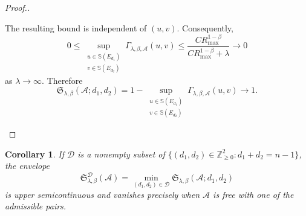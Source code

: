 \documentclass[pdflatex,sn-mathphys-num]{sn-jnl}%
\newtheorem{corollary}{Corollary}
\theoremstyle{remark}
\newtheorem{remark}{Remark}
\theoremstyle{definition}
\begin{document}
\begin{proof}[Proof.]
\begin{itemize}
The resulting bound is independent of $(u,v)$. Consequently,
\[
0
\leq
\sup_{\substack{u\in\mathbb S(E_{d_1})\\
v\in\mathbb S(E_{d_2})}}
\Gamma_{\lambda,\beta,\mathcal{A}}(u,v)
\leq
\frac{CR_{\max}^{1-\beta}}
{CR_{\max}^{1-\beta}+\lambda}
\longrightarrow0
\]
as $\lambda\to\infty$. Therefore
\[
\mathfrak S_{\lambda,\beta}(\mathcal{A};d_1,d_2)
=
1-
\sup_{\substack{u\in\mathbb S(E_{d_1})\\
v\in\mathbb S(E_{d_2})}}
\Gamma_{\lambda,\beta,\mathcal{A}}(u,v)
\longrightarrow1.
\]

\end{itemize}
\end{proof}


\begin{corollary}
\label{corollary:envelope-functional}
 If $\mathscr D$ is a nonempty subset of $\{(d_1,d_2) \in \mathbb{Z}_{\geq0}^2 : d_1+d_2=n-1\}$, the envelope
\begin{equation}
\label{eq:pair-envelope}
\mathfrak S^{\mathscr D}_{\lambda,\beta}(\mathcal{A})
=\min_{(d_1,d_2)\in\mathscr D}
\mathfrak S_{\lambda,\beta}(\mathcal{A};d_1,d_2)
\end{equation}
is upper semicontinuous and vanishes precisely when $\mathcal{A}$ is free with one of the admissible pairs. 
\end{corollary}

 
\end{document}
